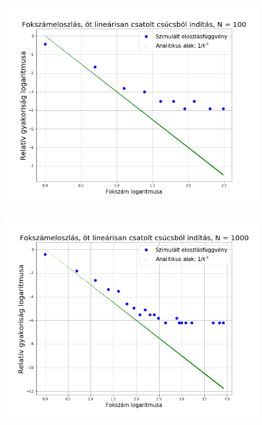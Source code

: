 \documentclass[a4paper, 12pt]{article}
\numberwithin{equation}{section}          %
\numberwithin{figure}{subsection}
\begin{document}
\begin{figure}[ch!]
	\begin{center}
		\includegraphics[width=1\textwidth]{masodik100log.png}
	\end{center}
\end{figure}
\clearpage
\begin{figure}[c!]
	\begin{center}
		\includegraphics[width=1\textwidth]{masodik1000log.png}
	\end{center}
\end{figure}
\clearpage
\end{document}
